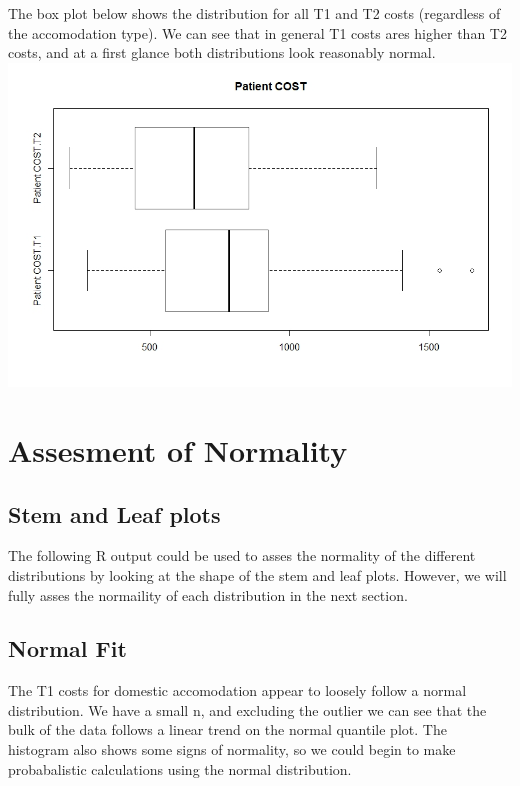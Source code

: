 \documentclass[]{article}
\begin{document}
The box plot below shows the distribution for all T1 and T2 costs (regardless of the accomodation type). We can see that in general T1 costs ares higher than T2 costs, and at a first glance both distributions look reasonably normal.
\centering
\includegraphics[width=\textwidth]{RStudio/jpeg/Box_COST.jpeg}
\raggedright

\section{Assesment of Normality}
\subsection{Stem and Leaf plots}
The following R output could be used to asses the normality of the different distributions by looking at the shape of the stem and leaf plots. However, we will fully asses the normaility of each distribution in the next section.



\subsection{Normal Fit}
The T1 costs for domestic accomodation appear to loosely follow a normal distribution. We have a small n, and excluding the outlier we can see that the bulk of the data follows a linear trend on the normal quantile plot. The histogram also shows some signs of normality, so we could begin to make probabalistic calculations using the normal distribution.
\end{document}
